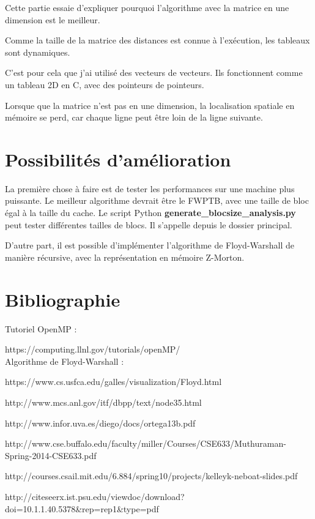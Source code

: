 \documentclass[a4paper,11pt]{article}
\begin{document}
Cette partie essaie d'expliquer pourquoi l'algorithme avec la matrice en une dimension est le meilleur.

Comme la taille de la matrice des distances est connue à l'exécution, les tableaux sont dynamiques.

C'est pour cela que j'ai utilisé des vecteurs de vecteurs. Ils fonctionnent comme un tableau 2D en C, avec des pointeurs de pointeurs.

Lorsque que la matrice n'est pas en une dimension, la localisation spatiale en mémoire se perd, car chaque ligne peut être loin de la ligne suivante.

\section{Possibilités d'amélioration}

La première chose à faire est de tester les performances sur une machine plus puissante. Le meilleur algorithme devrait être le FWPTB, avec une taille de bloc égal à la taille du cache. Le script Python \textbf{generate\_blocsize\_analysis.py} peut tester différentes tailles de blocs. Il s'appelle depuis le dossier principal.

D'autre part, il est possible d'implémenter l'algorithme de Floyd-Warshall de manière récursive, avec la représentation en mémoire Z-Morton.

\section{Bibliographie}

\noindent Tutoriel OpenMP :

https://computing.llnl.gov/tutorials/openMP/\\

\noindent Algorithme de Floyd-Warshall :

https://www.cs.usfca.edu/galles/visualization/Floyd.html

http://www.mcs.anl.gov/itf/dbpp/text/node35.html

http://www.infor.uva.es/diego/docs/ortega13b.pdf

http://www.cse.buffalo.edu/faculty/miller/Courses/CSE633/Muthuraman-Spring-2014-CSE633.pdf

http://courses.csail.mit.edu/6.884/spring10/projects/kelleyk-neboat-slides.pdf

http://citeseerx.ist.psu.edu/viewdoc/download?doi=10.1.1.40.5378\&rep=rep1\&type=pdf
\end{document}
